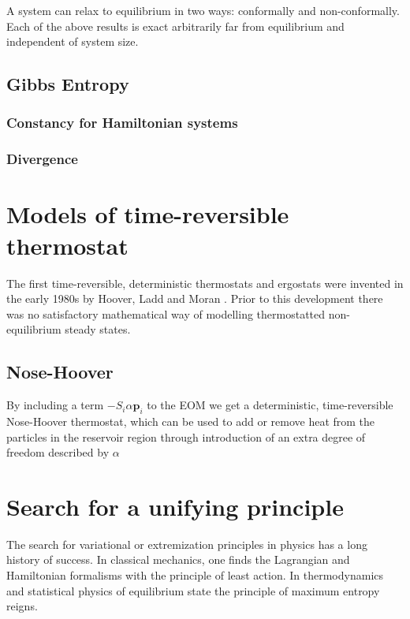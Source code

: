 \documentclass[a4paper,12pt,nofootinbib]{article}
\begin{document}
A system can relax to equilibrium in two ways: conformally and non-conformally.
Each of the above results is exact arbitrarily far from equilibrium and independent of system size.

\subsection{Gibbs Entropy}

\subsubsection{Constancy for Hamiltonian systems}

\subsubsection{Divergence}

\section{Models of time-reversible thermostat}

The first time-reversible, deterministic thermostats and ergostats were invented in the early 1980s by Hoover, Ladd and Moran . Prior to this development there was no satisfactory mathematical way of modelling thermostatted non-equilibrium steady states. \cite{Hoover:1982dp}

\subsection{Nose-Hoover}

By including a term $-S_i \alpha \bm{p}_i $ to the EOM we get a deterministic, time-reversible Nose-Hoover thermostat, which can be used to add or remove heat from the particles in the reservoir region through introduction of an extra degree of freedom described by $\alpha$

\section{Search for a unifying principle}

The search for variational or extremization principles in physics has a long history of success. In classical mechanics, one finds the Lagrangian and Hamiltonian formalisms with the principle of least action. In thermodynamics and statistical physics of equilibrium state the principle of maximum entropy reigns. 
\end{document}
